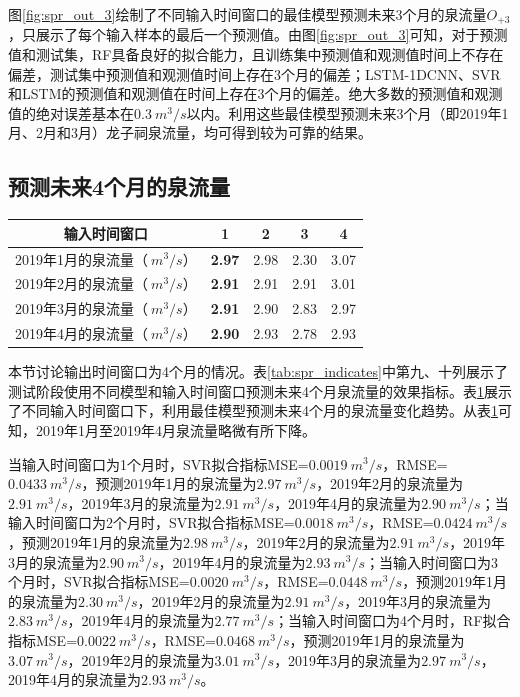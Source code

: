 图\ref{fig:spr_out_3}绘制了不同输入时间窗口的最佳模型预测未来3个月的泉流量$O_{+3}$，只展示了每个输入样本的最后一个预测值。由图\ref{fig:spr_out_3}可知，对于预测值和测试集，RF具备良好的拟合能力，且训练集中预测值和观测值时间上不存在偏差，测试集中预测值和观测值时间上存在3个月的偏差；LSTM-1DCNN、SVR和LSTM的预测值和观测值在时间上存在3个月的偏差。绝大多数的预测值和观测值的绝对误差基本在$\SI{0.3}{m^{3}/s}$以内。利用这些最佳模型预测未来3个月（即2019年1月、2月和3月）龙子祠泉流量，均可得到较为可靠的结果。

\subsection{预测未来4个月的泉流量}\label{sec:spr_four}

\begin{table}[!htbp]
  \centering
  \label{tab:spr_four}
  \footnotesize
  \begin{tabular}{ccccc}
    \toprule
    输入时间窗口 & 1 & 2 & 3 & 4\\
    \midrule
    2019年1月的泉流量（$\SI{}{m^{3}/s}$）& \textbf{2.97} & 2.98 & 2.30 & 3.07 \\
    2019年2月的泉流量（$\SI{}{m^{3}/s}$）& \textbf{2.91} & 2.91 & 2.91 & 3.01 \\
    2019年3月的泉流量（$\SI{}{m^{3}/s}$）& \textbf{2.91} & 2.90 & 2.83 & 2.97 \\
    2019年4月的泉流量（$\SI{}{m^{3}/s}$）& \textbf{2.90} & 2.93 & 2.78 & 2.93 \\
    \bottomrule
  \end{tabular}
\end{table}

本节讨论输出时间窗口为4个月的情况。表\ref{tab:spr_indicates}中第九、十列展示了测试阶段使用不同模型和输入时间窗口预测未来4个月泉流量的效果指标。表\ref{tab:spr_four}展示了不同输入时间窗口下，利用最佳模型预测未来4个月的泉流量变化趋势。从表\ref{tab:spr_four}可知，2019年1月至2019年4月泉流量略微有所下降。

当输入时间窗口为1个月时，SVR拟合指标MSE=$\SI{0.0019}{m^{3}/s}$，RMSE=\\$\SI{0.0433}{m^{3}/s}$，预测2019年1月的泉流量为$\SI{2.97}{m^{3}/s}$，2019年2月的泉流量为$\SI{2.91}{m^{3}/s}$，2019年3月的泉流量为$\SI{2.91}{m^{3}/s}$，2019年4月的泉流量为$\SI{2.90}{m^{3}/s}$；当输入时间窗口为2个月时，SVR拟合指标MSE=$\SI{0.0018}{m^{3}/s}$，RMSE=$\SI{0.0424}{m^{3}/s}$，预测2019年1月的泉流量为$\SI{2.98}{m^{3}/s}$，2019年2月的泉流量为$\SI{2.91}{m^{3}/s}$，2019年3月的泉流量为$\SI{2.90}{m^{3}/s}$，2019年4月的泉流量为$\SI{2.93}{m^{3}/s}$；当输入时间窗口为3个月时，SVR拟合指标MSE=$\SI{0.0020}{m^{3}/s}$，RMSE=$\SI{0.0448}{m^{3}/s}$，预测2019年1月的泉流量为$\SI{2.30}{m^{3}/s}$，2019年2月的泉流量为$\SI{2.91}{m^{3}/s}$，2019年3月的泉流量为$\SI{2.83}{m^{3}/s}$，2019年4月的泉流量为$\SI{2.77}{m^{3}/s}$；当输入时间窗口为4个月时，RF拟合指标MSE=$\SI{0.0022}{m^{3}/s}$，RMSE=$\SI{0.0468}{m^{3}/s}$，预测2019年1月的泉流量为$\SI{3.07}{m^{3}/s}$，2019年2月的泉流量为$\SI{3.01}{m^{3}/s}$，2019年3月的泉流量为$\SI{2.97}{m^{3}/s}$，2019年4月的泉流量为$\SI{2.93}{m^{3}/s}$。

